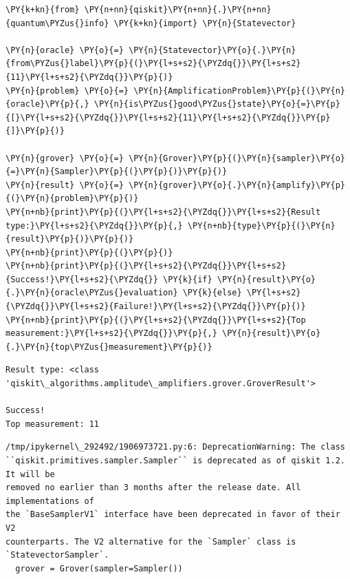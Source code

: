     \begin{tcolorbox}[breakable, size=fbox, boxrule=1pt, pad at break*=1mm,colback=cellbackground, colframe=cellborder]
\begin{Verbatim}[commandchars=\\\{\}]
\PY{k+kn}{from} \PY{n+nn}{qiskit}\PY{n+nn}{.}\PY{n+nn}{quantum\PYZus{}info} \PY{k+kn}{import} \PY{n}{Statevector}

\PY{n}{oracle} \PY{o}{=} \PY{n}{Statevector}\PY{o}{.}\PY{n}{from\PYZus{}label}\PY{p}{(}\PY{l+s+s2}{\PYZdq{}}\PY{l+s+s2}{11}\PY{l+s+s2}{\PYZdq{}}\PY{p}{)}
\PY{n}{problem} \PY{o}{=} \PY{n}{AmplificationProblem}\PY{p}{(}\PY{n}{oracle}\PY{p}{,} \PY{n}{is\PYZus{}good\PYZus{}state}\PY{o}{=}\PY{p}{[}\PY{l+s+s2}{\PYZdq{}}\PY{l+s+s2}{11}\PY{l+s+s2}{\PYZdq{}}\PY{p}{]}\PY{p}{)}

\PY{n}{grover} \PY{o}{=} \PY{n}{Grover}\PY{p}{(}\PY{n}{sampler}\PY{o}{=}\PY{n}{Sampler}\PY{p}{(}\PY{p}{)}\PY{p}{)}
\PY{n}{result} \PY{o}{=} \PY{n}{grover}\PY{o}{.}\PY{n}{amplify}\PY{p}{(}\PY{n}{problem}\PY{p}{)}
\PY{n+nb}{print}\PY{p}{(}\PY{l+s+s2}{\PYZdq{}}\PY{l+s+s2}{Result type:}\PY{l+s+s2}{\PYZdq{}}\PY{p}{,} \PY{n+nb}{type}\PY{p}{(}\PY{n}{result}\PY{p}{)}\PY{p}{)}
\PY{n+nb}{print}\PY{p}{(}\PY{p}{)}
\PY{n+nb}{print}\PY{p}{(}\PY{l+s+s2}{\PYZdq{}}\PY{l+s+s2}{Success!}\PY{l+s+s2}{\PYZdq{}} \PY{k}{if} \PY{n}{result}\PY{o}{.}\PY{n}{oracle\PYZus{}evaluation} \PY{k}{else} \PY{l+s+s2}{\PYZdq{}}\PY{l+s+s2}{Failure!}\PY{l+s+s2}{\PYZdq{}}\PY{p}{)}
\PY{n+nb}{print}\PY{p}{(}\PY{l+s+s2}{\PYZdq{}}\PY{l+s+s2}{Top measurement:}\PY{l+s+s2}{\PYZdq{}}\PY{p}{,} \PY{n}{result}\PY{o}{.}\PY{n}{top\PYZus{}measurement}\PY{p}{)}
\end{Verbatim}
\end{tcolorbox}

    \begin{Verbatim}[commandchars=\\\{\}]
Result type: <class
'qiskit\_algorithms.amplitude\_amplifiers.grover.GroverResult'>

Success!
Top measurement: 11
    \end{Verbatim}

    \begin{Verbatim}[commandchars=\\\{\}]
/tmp/ipykernel\_292492/1906973721.py:6: DeprecationWarning: The class
``qiskit.primitives.sampler.Sampler`` is deprecated as of qiskit 1.2. It will be
removed no earlier than 3 months after the release date. All implementations of
the `BaseSamplerV1` interface have been deprecated in favor of their V2
counterparts. The V2 alternative for the `Sampler` class is
`StatevectorSampler`.
  grover = Grover(sampler=Sampler())
    \end{Verbatim}

